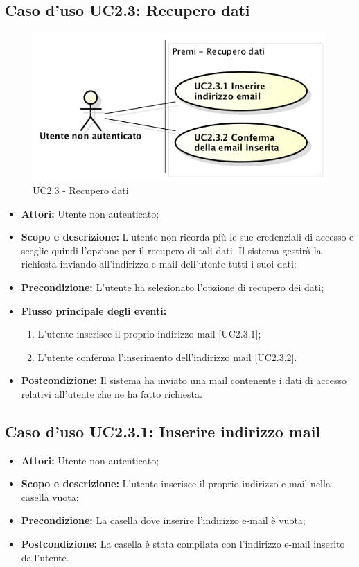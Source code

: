 \subsection{Caso d'uso UC2.3: Recupero dati}
\begin{figure}[h] 
	\centering 
	\includegraphics[scale=0.45] {img/UC2.3.png}
	\caption{UC2.3 - Recupero dati} 
\end{figure}
\begin{itemize}
	\item \textbf{Attori:} Utente non autenticato;
	\item \textbf{Scopo e descrizione:} L'utente non ricorda più le sue credenziali di accesso e sceglie quindi l'opzione per il recupero di tali dati. Il sistema gestirà la richiesta inviando all'indirizzo e-mail dell'utente tutti i suoi dati;
	\item \textbf{Precondizione:} L'utente ha selezionato l'opzione di recupero dei dati;
	\item \textbf{Flusso principale degli eventi:}
	\begin{enumerate}
		\item L'utente inserisce il proprio indirizzo mail [UC2.3.1];
		\item L'utente conferma l'inserimento dell'indirizzo mail [UC2.3.2].
	\end{enumerate}
	\item \textbf{Postcondizione:} Il sistema ha inviato una mail contenente i dati di accesso relativi all'utente che ne ha fatto richiesta.
\end{itemize}

	\subsection{Caso d'uso UC2.3.1: Inserire indirizzo mail}
	\begin{itemize}
		\item \textbf{Attori:} Utente non autenticato;
		\item \textbf{Scopo e descrizione:} L'utente inserisce il proprio indirizzo e-mail nella casella vuota;
		\item \textbf{Precondizione:} La casella dove inserire l'indirizzo e-mail è vuota;
		\item \textbf{Postcondizione:} La casella è stata compilata con l'indirizzo e-mail inserito dall'utente.
	\end{itemize}
	
